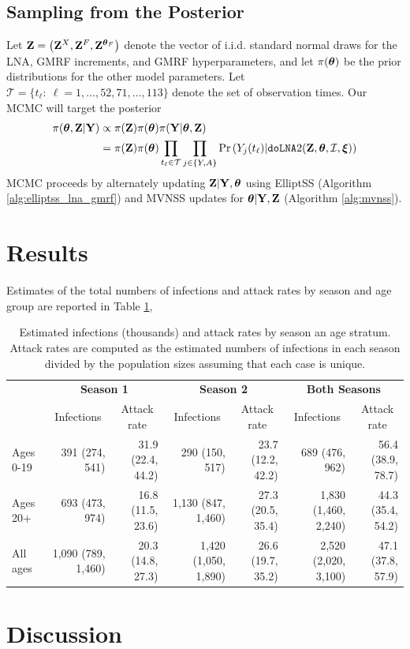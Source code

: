 \subsection{Sampling from the Posterior}
\label{subsec:flu_model}

Let $ \mathbf{Z} = \left (\mathbf{Z}^X,\mathbf{Z}^F,\mathbf{Z}^{\boldsymbol{\theta}_F}\right ) $ denote the vector of i.i.d. standard normal draws for the LNA, GMRF increments, and GMRF hyperparameters, and let $ \pi(\boldsymbol{\theta}) $ be the prior distributions for the other model parameters. Let $ \mathcal{T} = \lbrace t_\ell:\ \ell = 1,\dots,52,71,\dots,113 \rbrace $ denote the set of observation times. Our MCMC will target the posterior
\begin{align}
\label{eqn:flu_posterior}
\pi(\boldsymbol{\theta},\mathbf{Z} | \mathbf{Y}) &\propto \pi(\mathbf{Z})\pi(\boldsymbol{\theta})\pi(\mathbf{Y}|\boldsymbol{\theta},\mathbf{Z}) \nonumber\\
&= \pi(\mathbf{Z})\pi(\boldsymbol{\theta}) \prod_{t_\ell\in\mathcal{T}}\prod_{j\in\lbrace Y,A\rbrace} \Pr\left (Y_{j}(t_\ell) | \texttt{doLNA}2(\mathbf{Z},\boldsymbol{\theta},\mathcal{I},\boldsymbol{\xi})\right )
\end{align}
MCMC proceeds by alternately updating $ \mathbf{Z}|\mathbf{Y},\boldsymbol{\theta} $ using ElliptSS (Algorithm \ref{alg:elliptss_lna_gmrf}) and MVNSS updates for $ \boldsymbol{\theta}|\mathbf{Y},\mathbf{Z} $ (Algorithm \ref{alg:mvnss}). 

\section{Results}
\label{sec:flu_results}

Estimates of the total numbers of infections and attack rates by season and age group are reported in Table \ref{tab:flu_attack_rates}, 

\begin{table}
	\caption{Estimated infections (thousands) and attack rates by season an age stratum. Attack rates are computed as the estimated numbers of infections in each season divided by the population sizes assuming that each case is unique.}
	\label{tab:flu_attack_rates}
	\centering\footnotesize
	\begin{tabular}{lrrrrrr}
		\hline
		\multicolumn{1}{c}{\bfseries } & \multicolumn{2}{c}{\bfseries Season 1} & \multicolumn{2}{c}{\bfseries Season 2} & \multicolumn{2}{c}{\bfseries Both Seasons} \\
		\cmidrule(r){2-3} \cmidrule(lr){4-5} \cmidrule(l){6-7}
		& \multicolumn{1}{c}{Infections} & \multicolumn{1}{c}{Attack rate} & \multicolumn{1}{c}{Infections} & \multicolumn{1}{c}{Attack rate} & \multicolumn{1}{c}{Infections} & \multicolumn{1}{c}{Attack rate}\\
		\hline
		Ages 0-19 & 391 (274, 541) & 31.9 (22.4, 44.2) & 290 (150, 517) & 23.7 (12.2, 42.2) & 689 (476, 962) & 56.4 (38.9, 78.7)\\
		Ages 20+ & 693 (473, 974) & 16.8 (11.5, 23.6) & 1,130 (847, 1,460) & 27.3 (20.5, 35.4) & 1,830 (1,460, 2,240) & 44.3 (35.4, 54.2)\\
		All ages & 1,090 (789, 1,460) & 20.3 (14.8, 27.3) & 1,420 (1,050, 1,890) & 26.6 (19.7, 35.2) & 2,520 (2,020, 3,100) & 47.1 (37.8, 57.9)\\
		\hline
	\end{tabular}
\end{table}

\section{Discussion}
\label{sec:flu_discussion}